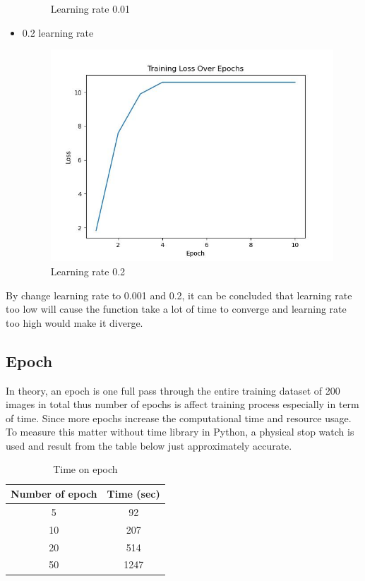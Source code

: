 \documentclass[journal]{IEEEtran} %
\begin{document}
\begin{itemize}
\begin{figure}[h!]
        \caption{Learning rate 0.01}
    \end{figure}
    \newpage
    \item 0.2 learning rate
    \begin{figure}[h!]
        \centering
        \includegraphics[width=1\linewidth]{learningRate3.png}
        \caption{Learning rate 0.2}
    \end{figure}
\end{itemize}

By change learning rate to 0.001 and 0.2, it can be concluded that learning rate too low will cause the function take a lot of time to converge and learning rate too high would make it diverge.


\subsection{Epoch}
In theory, an epoch is one full pass through the entire training dataset of 200 images in total thus number of epochs is affect training process especially in term of time. Since more epochs increase the computational time and resource usage. To measure this matter without time library in Python, a physical stop watch is used and result from the table below just approximately accurate. 

\begin{table}[h!]
    \centering
    \begin{tabular}{c c} \hline
        Number of epoch & Time (sec)  \\ \hline
        5 & 92 \\
        10 & 207 \\
        20 & 514 \\
        50 & 1247\\ \hline
    \end{tabular}
    \caption{Time on epoch}
\end{table}
\end{document}
